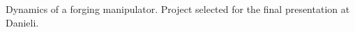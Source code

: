 \documentclass[11pt,a4paper,sans]{moderncv} %
\begin{document}



 {Dynamics of a forging manipulator. Project selected for the final presentation at Danieli.}






\end{document}
